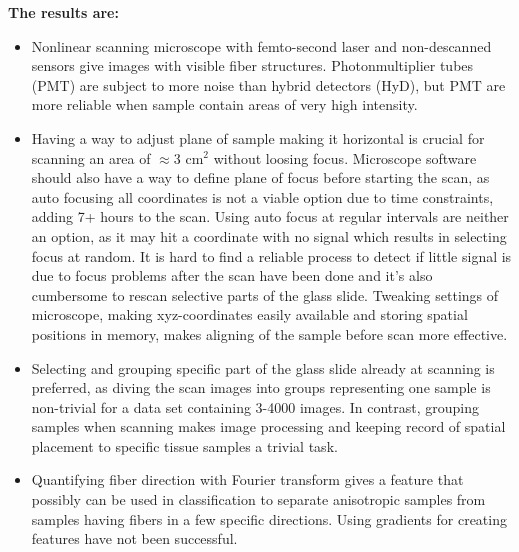 \textbf{The results are:}
\begin{itemize}
\item  Nonlinear scanning microscope with femto-second laser and non-descanned sensors give images with visible fiber structures. Photonmultiplier tubes (PMT) are subject to more noise than hybrid detectors (HyD), but PMT are more reliable when sample contain areas of very high intensity.
\item Having a way to adjust plane of sample making it horizontal is crucial for scanning an area of $\approx 3$ cm$^2$ without loosing focus. Microscope software should also have a way to define plane of focus before starting the scan, as auto focusing all coordinates is not a viable option due to time constraints, adding 7+ hours to the scan. Using auto focus at regular intervals are neither an option, as it may hit a coordinate with no signal which results in selecting focus at random. It is hard to find a reliable process to detect if little signal is due to focus problems after the scan have been done and it's also cumbersome to rescan selective parts of the glass slide. Tweaking settings of microscope, making xyz-coordinates easily available and storing spatial positions in memory, makes aligning of the sample before scan more effective.
\item Selecting and grouping specific part of the glass slide already at scanning is preferred, as diving the scan images into groups representing one sample is non-trivial for a data set containing 3-4000 images. In contrast, grouping samples when scanning makes image processing and keeping record of spatial placement to specific tissue samples a trivial task.
\item Quantifying fiber direction with Fourier transform gives a feature that possibly can be used in classification to separate anisotropic samples from samples having fibers in a few specific directions. Using gradients for creating features have not been successful.
\end{itemize}